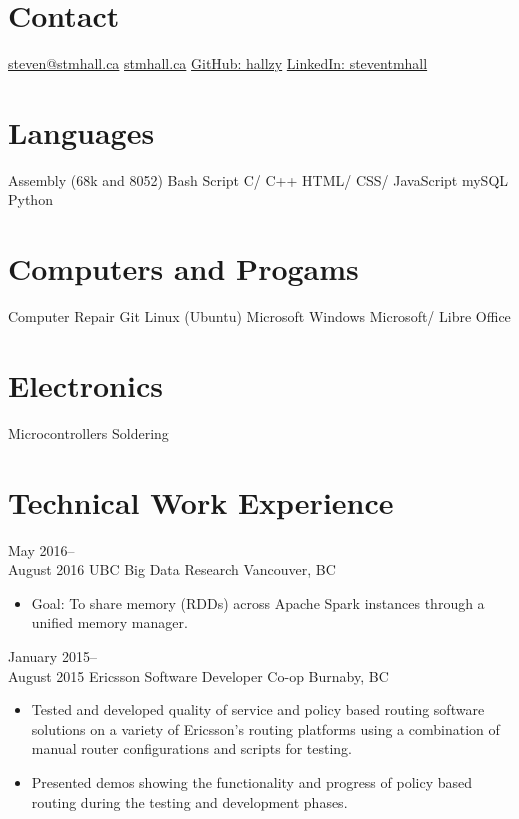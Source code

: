 \documentclass[]{friggeri-cv} %
\begin{document}


\begin{aside} %
\section{Contact}
\href{mailto:steven@stmhall.ca}{steven@stmhall.ca}
\href{http://stmhall.ca}{stmhall.ca}
\href{http://github.com/hallzy}{GitHub: hallzy}
\href{https://www.linkedin.com/in/steventmhall}{LinkedIn: steventmhall}
\section{Languages}
Assembly (68k and 8052)
Bash Script
C/ C++
HTML/ CSS/ JavaScript
mySQL
Python
\section{Computers and Progams}
Computer Repair
Git
Linux (Ubuntu)
Microsoft Windows
Microsoft/ Libre Office
\section{Electronics}
Microcontrollers
Soldering
\end{aside}

\section{Technical Work Experience}

\begin{entrylist}

\entry
{May 2016--\\August 2016}
{UBC {\normalfont Big Data Research}}
{Vancouver, BC}
{
\begin{itemize}
\item Goal: To share memory (RDDs) across Apache Spark instances through a
unified memory manager.
\end{itemize}
}
\entry
{January 2015--\\August 2015}
{Ericsson {\normalfont Software Developer Co-op}}
{Burnaby, BC}
{
\begin{itemize}
\item Tested and developed quality of service and policy based routing software
solutions on a variety of Ericsson's routing platforms using a combination of
manual router configurations and scripts for testing.
\item Presented demos showing the functionality and progress of policy based
routing during the testing and development phases.
\end{itemize}
}
\end{entrylist}
\end{document}
